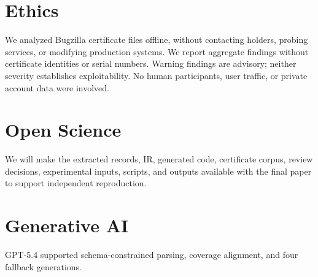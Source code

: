 \section{Ethics}

We analyzed Bugzilla certificate files offline, without contacting holders,
probing services, or modifying production systems. We report aggregate
findings without certificate identities or serial numbers. Warning findings
are advisory; neither severity establishes exploitability. No human
participants, user traffic, or private account data were involved.

\section{Open Science}

We will make the extracted records, IR, generated code, certificate corpus,
review decisions, experimental inputs, scripts, and outputs available with
the final paper to support independent reproduction.

\section{Generative AI}

GPT-5.4 supported schema-constrained parsing, coverage alignment, and four
fallback generations.

